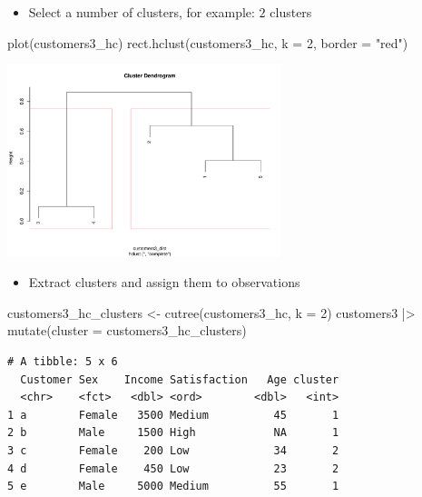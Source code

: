 \documentclass[
  ignorenonframetext,
]{beamer}
\newenvironment{Shaded}{\begin{snugshade}}{\end{snugshade}}
\newcommand{\AttributeTok}[1]{\textcolor[rgb]{0.40,0.45,0.13}{#1}}
\newcommand{\DecValTok}[1]{\textcolor[rgb]{0.68,0.00,0.00}{#1}}
\newcommand{\FunctionTok}[1]{\textcolor[rgb]{0.28,0.35,0.67}{#1}}
\newcommand{\NormalTok}[1]{\textcolor[rgb]{0.00,0.23,0.31}{#1}}
\newcommand{\OtherTok}[1]{\textcolor[rgb]{0.00,0.23,0.31}{#1}}
\newcommand{\SpecialCharTok}[1]{\textcolor[rgb]{0.37,0.37,0.37}{#1}}
\newcommand{\StringTok}[1]{\textcolor[rgb]{0.13,0.47,0.30}{#1}}
\providecommand{\tightlist}{%
  \setlength{\itemsep}{0pt}\setlength{\parskip}{0pt}}\usepackage{longtable,booktabs,array}
\begin{document}
\begin{frame}[fragile]{}
\label{section-30}
\begin{itemize}
\tightlist
\item
  Select a number of clusters, for example: \(2\) clusters
\end{itemize}

\tiny

\begin{Shaded}
\begin{Highlighting}[]
\FunctionTok{plot}\NormalTok{(customers3\_hc)}
\FunctionTok{rect.hclust}\NormalTok{(customers3\_hc, }\AttributeTok{k =} \DecValTok{2}\NormalTok{, }\AttributeTok{border =} \StringTok{"red"}\NormalTok{)}
\end{Highlighting}
\end{Shaded}

\begin{center}
\includegraphics[width=0.6\textwidth,height=\textheight]{011_segmentation_clustering_files/figure-beamer/unnamed-chunk-20-1.pdf}
\end{center}
\end{frame}

\begin{frame}[fragile]{}
\label{section-31}
\begin{itemize}
\tightlist
\item
  Extract clusters and assign them to observations
\end{itemize}

\tiny

\begin{Shaded}
\begin{Highlighting}[]
\NormalTok{customers3\_hc\_clusters }\OtherTok{\textless{}{-}} \FunctionTok{cutree}\NormalTok{(customers3\_hc, }\AttributeTok{k =} \DecValTok{2}\NormalTok{)}
\NormalTok{customers3 }\SpecialCharTok{|\textgreater{}} 
  \FunctionTok{mutate}\NormalTok{(}\AttributeTok{cluster =}\NormalTok{ customers3\_hc\_clusters)}
\end{Highlighting}
\end{Shaded}

\begin{verbatim}
# A tibble: 5 x 6
  Customer Sex    Income Satisfaction   Age cluster
  <chr>    <fct>   <dbl> <ord>        <dbl>   <int>
1 a        Female   3500 Medium          45       1
2 b        Male     1500 High            NA       1
3 c        Female    200 Low             34       2
4 d        Female    450 Low             23       2
5 e        Male     5000 Medium          55       1
\end{verbatim}
\end{frame}
\end{document}
